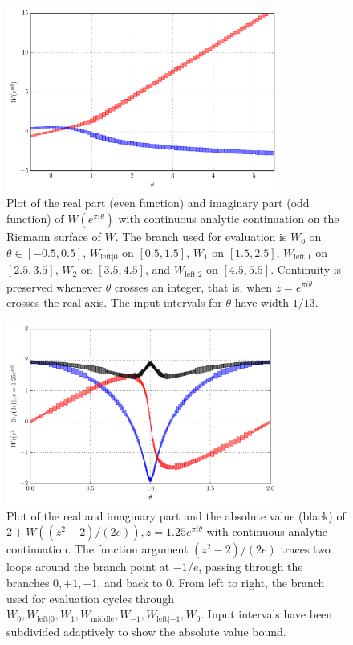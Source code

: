 \documentclass[11pt,a4paper]{article}
\begin{document}
\begin{figure}
\begin{centering}
\includegraphics[width=0.8\textwidth]{plottheta}
\caption{
Plot of the real part (even function) and imaginary part (odd function) of $W(e^{\pi i \theta})$
with continuous analytic continuation
on the Riemann surface of $W$. The branch used for evaluation is
$W_0$ on $\theta \in [-0.5,0.5]$, $W_{\mathrm{left}|0}$ on $[0.5,1.5]$,
$W_1$ on $[1.5,2.5]$, $W_{\mathrm{left}|1}$ on $[2.5,3.5]$,
$W_2$ on $[3.5,4.5]$, and $W_{\mathrm{left}|2}$ on $[4.5,5.5]$.
Continuity is preserved whenever $\theta$ crosses an integer, that
is, when $z = e^{\pi i \theta}$ crosses the real axis.
The input intervals for $\theta$ have width $1/13$.
}
\end{centering}
\end{figure}

\begin{figure}
\begin{centering}
\includegraphics[width=0.8\textwidth]{plotbb}
\caption{
Plot of the real and imaginary part and the absolute
value (black) of $2 + W((z^2-2)/(2e)), z = 1.25 e^{\pi i \theta}$
with continuous analytic continuation.
The function argument $(z^2-2)/(2e)$ traces two loops around the branch point at $-1/e$,
passing through the branches $0, +1, -1$, and back to $0$.
From left to right,
the branch used for evaluation
cycles through $W_0, W_{\mathrm{left}|0}, W_1, W_{\mathrm{middle}}, W_{-1}, W_{\mathrm{left}|-1}, W_0$.
Input intervals have been subdivided adaptively to show the absolute value bound.
}
\label{fig:bcircle}
\end{centering}
\end{figure}
\end{document}
